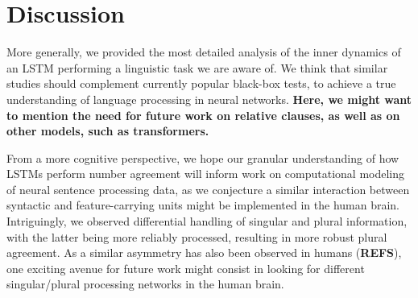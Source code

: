 
\section{Discussion}
More generally, we provided the most detailed analysis of the inner
dynamics of an LSTM performing a linguistic task we are aware of. We
think that similar studies should complement currently popular
black-box tests, to achieve a true understanding of language
processing in neural networks. \textbf{Here, we might want to mention
  the need for future work on relative clauses, as well as on other
  models, such as transformers.}

From a more cognitive perspective, we hope our granular
understanding of how LSTMs perform number agreement will inform work
on computational modeling of neural sentence processing data, as we
conjecture a similar interaction between syntactic and
feature-carrying units might be implemented in the human
brain. Intriguingly, we observed differential handling of singular and
plural information, with the latter being more reliably processed,
resulting in more robust plural agreement. As a similar asymmetry has
also been observed in humans (\textbf{REFS}), one exciting avenue for
future work might consist in looking for different singular/plural
processing networks in the human brain.
